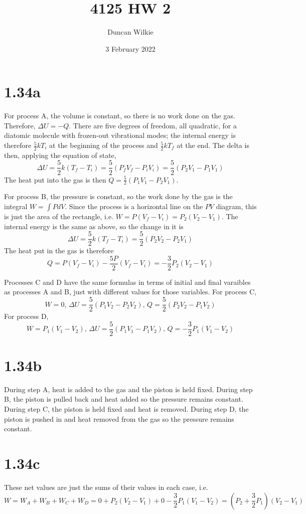 \documentclass{article}
\title{4125 HW 2}
\author{Duncan Wilkie}
\date{3 February 2022}
\begin{document}
\maketitle

\section*{1.34a}
For process A, the volume is constant, so there is no work done on the gas. Therefore, $\Delta U=-Q$. There are five degrees of freedom, all quadratic, for a diatomic molecule with frozen-out vibrational modes; the internal energy is therefore $\frac{5}{2}kT_i$ at the beginning of the process and $\frac{5}{2}kT_f$ at the end. The delta is then, applying the equation of state,
\[\Delta U=\frac{5}{2}k(T_f-T_i)=\frac{5}{2}\left(P_fV_f-P_iV_i \right)=\frac{5}{2}(P_2V_1-P_1V_1)\]
The heat put into the gas is then $Q=\frac{5}{2}(P_1V_1-P_2V_1)$.

For process B, the pressure is constant, so the work done by the gas is the integral $W=\int PdV$. Since the process is a horizontal line on the $PV$ diagram, this is just the area of the rectangle, i.e. $W=P(V_f-V_i)=P_2(V_2-V_1)$. The internal energy is the same as above, so the change in it is
\[\Delta U=\frac{5}{2}k(T_f-T_i)=\frac{5}{2}(P_2V_2-P_2V_1)\]
The heat put in the gas is therefore \[Q=P(V_f-V_i)-\frac{5P}{2}(V_f-V_i)=-\frac{3}{2}P_2(V_2-V_1)\]

Processes C and D have the same formulas in terms of initial and final varaibles as processes A and B, just with different values for those variables.
For process C,
\[W=0\textrm{, } \Delta U=\frac{5}{2}(P_1V_2-P_2V_2)\textrm{, } Q=\frac{5}{2}(P_2V_2-P_1V_2)\]
For process D,
\[W=P_1(V_1-V_2)\textrm{, }\Delta U=\frac{5}{2}(P_1V_1-P_1V_2)\textrm{, }Q=-\frac{3}{2}P_1(V_1-V_2)\]

\section*{1.34b}
During step A, heat is added to the gas and the piston is held fixed. During step B, the piston is pulled back and heat added so the pressure remains constant. During step C, the piston is held fixed and heat is removed. During step D, the piston is pushed in and heat removed from the gas so the pressure remains constant.

\section*{1.34c}
These net values are just the sums of their values in each case, i.e.
\[W=W_A+W_B+W_C+W_D=0+P_2(V_2-V_1)+0-\frac{3}{2}P_1(V_1-V_2)=(P_2+\frac{3}{2}P_1)(V_2-V_1)\]
\end{document}
